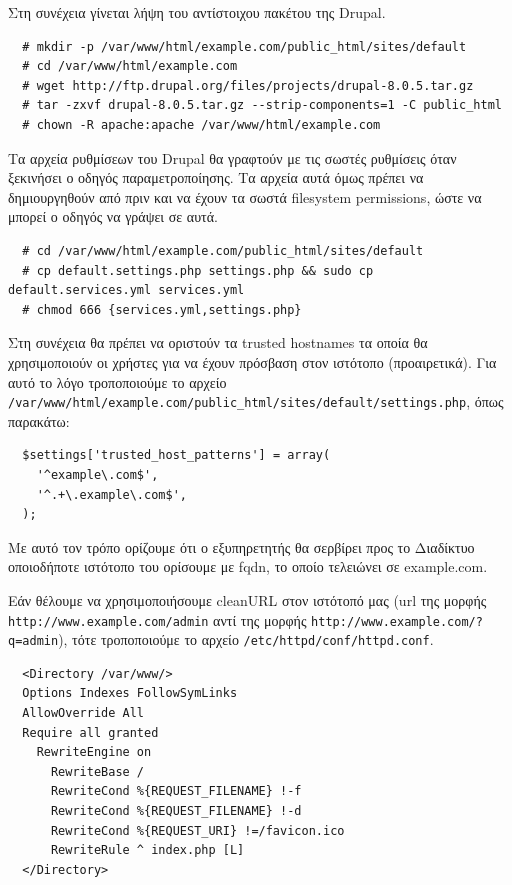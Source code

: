\documentclass[12pt]{report}
\begin{document}
Στη συνέχεια γίνεται λήψη του αντίστοιχου πακέτου της \textlatin{Drupal}.
\scriptsize
\begin{verbatim}
  # mkdir -p /var/www/html/example.com/public_html/sites/default
  # cd /var/www/html/example.com
  # wget http://ftp.drupal.org/files/projects/drupal-8.0.5.tar.gz
  # tar -zxvf drupal-8.0.5.tar.gz --strip-components=1 -C public_html
  # chown -R apache:apache /var/www/html/example.com
\end{verbatim}
\normalsize
{}

Τα αρχεία ρυθμίσεων του \textlatin{Drupal} θα γραφτούν με τις σωστές ρυθμίσεις όταν ξεκινήσει ο οδηγός παραμετροποίησης. Τα αρχεία αυτά όμως πρέπει να δημιουργηθούν από πριν και να έχουν τα σωστά \textlatin{filesystem permissions}, ώστε να μπορεί ο οδηγός να γράψει σε αυτά.
\scriptsize
\begin{verbatim}
  # cd /var/www/html/example.com/public_html/sites/default
  # cp default.settings.php settings.php && sudo cp default.services.yml services.yml
  # chmod 666 {services.yml,settings.php}
\end{verbatim}
\normalsize
{}

Στη συνέχεια θα πρέπει να οριστούν τα \textlatin{trusted hostnames} τα οποία θα χρησιμοποιούν οι χρήστες για να έχουν πρόσβαση στον ιστότοπο (προαιρετικά). Για αυτό το λόγο τροποποιούμε το αρχείο \textlatin{\texttt{/var/www/html/example.com/public\_html/sites/default/settings.php}}, όπως παρακάτω:
\scriptsize
\begin{verbatim}
  $settings['trusted_host_patterns'] = array(
    '^example\.com$',
    '^.+\.example\.com$',
  );
\end{verbatim}
\normalsize
{}

Με αυτό τον τρόπο ορίζουμε ότι ο εξυπηρετητής θα σερβίρει προς το Διαδίκτυο οποιοδήποτε ιστότοπο του ορίσουμε με \textlatin{fqdn}, το οποίο τελειώνει σε \textlatin{example.com}.

Εάν θέλουμε να χρησιμοποιήσουμε \textlatin{cleanURL} στον ιστότοπό μας (\textlatin{url} της μορφής \textlatin{\texttt{http://www.example.com/admin}} αντί της μορφής \textlatin{\texttt{http://www.example.com/?q=admin}}), τότε τροποποιούμε το αρχείο \textlatin{\texttt{/etc/httpd/conf/httpd.conf}}.
\scriptsize
\begin{verbatim}
  <Directory /var/www/>
  Options Indexes FollowSymLinks
  AllowOverride All
  Require all granted
    RewriteEngine on
      RewriteBase /
      RewriteCond %{REQUEST_FILENAME} !-f
      RewriteCond %{REQUEST_FILENAME} !-d
      RewriteCond %{REQUEST_URI} !=/favicon.ico
      RewriteRule ^ index.php [L]
  </Directory>
\end{verbatim}
\normalsize
{}
\end{document}
